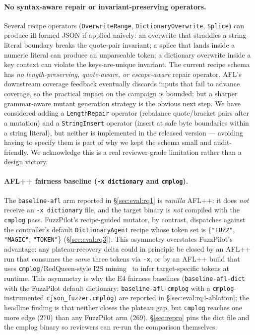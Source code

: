 \documentclass[11pt]{article}
\begin{document}
\paragraph{No syntax-aware repair or invariant-preserving
operators.}
Several recipe operators
(\texttt{OverwriteRange}, \texttt{DictionaryOverwrite},
\texttt{Splice}) can produce ill-formed JSON if applied
naively: an overwrite that straddles a string-literal boundary
breaks the quote-pair invariant; a splice that lands inside a
numeric literal can produce an unparseable token; a dictionary
overwrite inside a key context can violate the keys-are-unique
invariant. The current recipe schema has \emph{no
length-preserving, quote-aware, or escape-aware} repair
operator. AFL's downstream coverage feedback eventually discards
inputs that fail to advance coverage, so the practical impact on
the campaign is bounded; but a sharper grammar-aware mutant
generation strategy is the obvious next step. We have considered
adding a \texttt{LengthRepair} operator (rebalance quote/bracket
pairs after a mutation) and a \texttt{StringInsert} operator
(insert at safe byte boundaries within a string literal), but
neither is implemented in the released version --- avoiding
having to specify them is part of why we kept the schema small
and audit-friendly. We acknowledge this is a real reviewer-grade
limitation rather than a design victory.

\paragraph{AFL++ fairness baseline (\texttt{-x dictionary} and
\texttt{cmplog}).}
The \texttt{baseline-afl} arm reported in
\S\ref{sec:eval:rq1} is \emph{vanilla} AFL++: it does \emph{not}
receive an \texttt{-x dictionary} file, and the target binary is
\emph{not} compiled with the \texttt{cmplog} pass. FuzzPilot's
recipe-guided mutator, by contrast, dispatches against the
controller's default \texttt{DictionaryAgent} recipe whose token
set is \{\texttt{"FUZZ"}, \texttt{"MAGIC"}, \texttt{"TOKEN"}\}
(\S\ref{sec:eval:rq3}). This asymmetry overstates FuzzPilot's
advantage: any plateau-recovery delta could in principle be
closed by an AFL++ run that consumes the \emph{same} three tokens
via \texttt{-x}, or by an AFL++ build that uses
\texttt{cmplog}/RedQueen-style I2S
mining~\cite{aschermann2019redqueen,lafintel2016} to infer
target-specific tokens at runtime. This asymmetry is why the E4
fairness baselines
(\texttt{baseline-afl-dict} with the FuzzPilot default
dictionary; \texttt{baseline-afl-cmplog} with a
\texttt{cmplog}-instrumented \texttt{cjson\_fuzzer.cmplog})
are reported in \S\ref{sec:eval:rq4-ablation}; the headline
finding is that neither closes the plateau gap, but
\texttt{cmplog} reaches one more edge ($270$) than any
FuzzPilot arm ($269$). \S\ref{sec:repro} pins the dict file and
the cmplog binary so reviewers can re-run the comparison
themselves.
\end{document}
